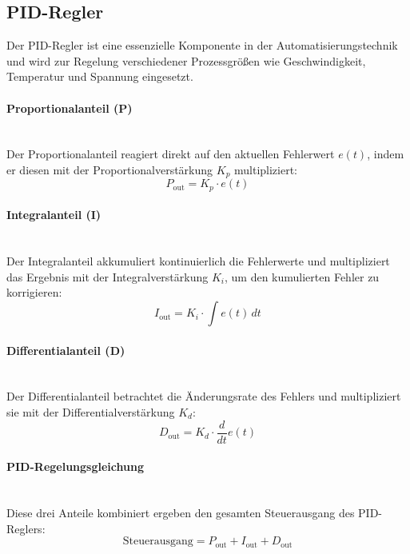 \subsection{PID-Regler}
\label{sec:PID-Regler}

Der PID-Regler ist eine essenzielle Komponente in der Automatisierungstechnik und wird zur Regelung verschiedener Prozessgrößen wie Geschwindigkeit, Temperatur und Spannung eingesetzt.

\paragraph{Proportionalanteil (P)} \mbox{}\\
Der Proportionalanteil reagiert direkt auf den aktuellen Fehlerwert \( e(t) \), indem er diesen mit der Proportionalverstärkung \( K_p \) multipliziert:
\begin{equation}
P_{\text{out}} = K_p \cdot e(t)
\end{equation}

\paragraph{Integralanteil (I)} \mbox{}\\
Der Integralanteil akkumuliert kontinuierlich die Fehlerwerte und multipliziert das Ergebnis mit der Integralverstärkung \( K_i \), um den kumulierten Fehler zu korrigieren:
\begin{equation}
I_{\text{out}} = K_i \cdot \int e(t) \, dt
\end{equation}

\paragraph{Differentialanteil (D)} \mbox{}\\
Der Differentialanteil betrachtet die Änderungsrate des Fehlers und multipliziert sie mit der Differentialverstärkung \( K_d \):
\begin{equation}
D_{\text{out}} = K_d \cdot \frac{d}{dt} e(t)
\end{equation}

\paragraph{PID-Regelungsgleichung} \mbox{}\\
Diese drei Anteile kombiniert ergeben den gesamten Steuerausgang des PID-Reglers:
\begin{equation}
\text{Steuerausgang} = P_{\text{out}} + I_{\text{out}} + D_{\text{out}}
\end{equation}

